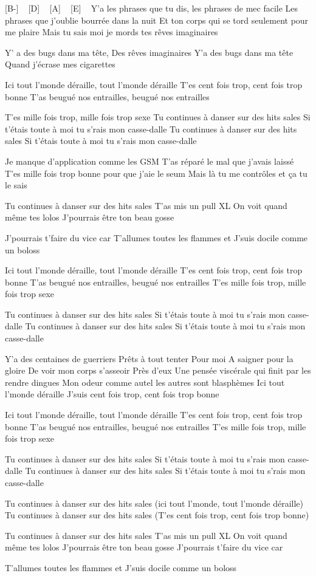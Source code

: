 

[B-] ~ [D] ~ [A] ~ [E] ~
Y'a les phrases que tu dis, les phrases de mec facile
Les phrases que j'oublie bourrée dans la nuit
Et ton corps qui se tord seulement pour me plaire
Mais tu sais moi je mords tes rêves imaginaires

Y' a des bugs dans ma tête,
Des rêves imaginaires
Y'a des bugs dans ma tête
Quand j'écrase mes cigarettes

Ici tout l'monde déraille, tout l'monde déraille
T'es cent fois trop, cent fois trop bonne
T'as beugué nos entrailles, beugué nos entrailles

T'es mille fois trop, mille fois trop sexe
Tu continues à danser sur des hits sales
Si t'étais toute à moi tu s'rais mon casse-dalle
Tu continues à danser sur des hits sales
Si t'étais toute à moi tu s'rais mon casse-dalle

Je manque d'application comme les GSM
T'as réparé le mal que j'avais laissé
T'es mille fois trop bonne pour que j'aie le seum
Mais là tu me contrôles et ça tu le sais

Tu continues à danser sur des hits sales
T'as mis un pull XL
On voit quand même tes lolos
J'pourrais être ton beau gosse

J'pourrais t'faire du vice car
T'allumes toutes les flammes et
J'suis docile comme un boloss

Ici tout l'monde déraille, tout l'monde déraille
T'es cent fois trop, cent fois trop bonne
T'as beugué nos entrailles, beugué nos entrailles
T'es mille fois trop, mille fois trop sexe

Tu continues à danser sur des hits sales
Si t'étais toute à moi tu s'rais mon casse-dalle
Tu continues à danser sur des hits sales
Si t'étais toute à moi tu s'rais mon casse-dalle


Y'a des centaines de guerriers
Prêts à tout tenter
Pour moi
A saigner pour la gloire
De voir mon corps s’asseoir
Près d'eux
Une pensée viscérale qui finit par les rendre dingues
Mon odeur comme autel les autres sont blasphèmes
Ici tout l'monde déraille
J'suis cent fois trop, cent fois trop bonne

Ici tout l'monde déraille, tout l'monde déraille
T'es cent fois trop, cent fois trop bonne
T'as beugué nos entrailles, beugué nos entrailles
T'es mille fois trop, mille fois trop sexe


Tu continues à danser sur des hits sales
Si t'étais toute à moi tu s'rais mon casse-dalle
Tu continues à danser sur des hits sales
Si t'étais toute à moi tu s'rais mon casse-dalle

Tu continues à danser sur des hits sales
(ici tout l'monde, tout l'monde déraille)
Tu continues à danser sur des hits sales
(T'es cent fois trop, cent fois trop bonne)

Tu continues à danser sur des hits sales
T'as mis un pull XL
On voit quand même tes lolos
J'pourrais être ton beau gosse
J'pourrais t'faire du vice car

T'allumes toutes les flammes et
J'suis docile comme un boloss
